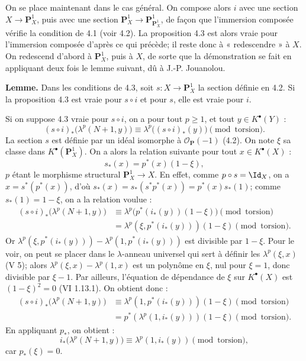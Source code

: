 \documentclass[11pt]{article}
\begin{document}
On se place maintenant dans le cas général. On compose alors \(i\) avec une section \(X\to\mathbf P_X^1\), puis avec une section \(\mathbf P_X^1\to\mathbf P_{\mathbf P_X^1}^1\), de façon que l'immersion composée vérifie la condition de 4.1 (voir 4.2). La proposition 4.3 est alors vraie pour l'immersion composée d'après ce qui précède; il reste donc à « redescendre » à \(X\). On redescend d'abord à \(\mathbf P_X^1\), puis à \(X\), de sorte que la démonstration se fait en appliquant deux fois le lemme suivant, dû à J.-P. Jouanolou.

\textbf{Lemme.} Dans les conditions de 4.3, soit \(s:X\to\mathbf P_X^1\) la section définie en 4.2. Si la proposition 4.3 est vraie pour \(s\circ i\) et pour \(s\), elle est vraie pour \(i\).

Si on suppose 4.3 vraie pour \(s\circ i\), on a pour tout \(p\ge1\), et tout \(y\in K^\bullet(Y)\) :
\begin{equation}\tag{4.3.3}
 (s\circ i)_*\bigl(\lambda^p(N+1,y)\bigr)
 \equiv
 \lambda^p\bigl((s\circ i)_*(y)\bigr)
 \pmod{\text{torsion}}.
\end{equation}
La section \(s\) est définie par un idéal isomorphe à \(\mathcal O_{\mathbf P}(-1)\) (4.2). On note \(\xi\) sa classe dans \(K^\bullet(\mathbf P_X^1)\). On a alors la relation suivante pour tout \(x\in K^\bullet(X)\) :
\[
  s_*(x)=p^*(x)(1-\xi),
\]
\(p\) étant le morphisme structural \(\mathbf P_X^1\to X\). En effet, comme \(p\circ s=\Id_X\), on a \(x=s^*(p^*(x))\), d'où \(s_*(x)=s_*(s^*p^*(x))=p^*(x)s_*(1)\); comme \(s_*(1)=1-\xi\), on a la relation voulue :
\[
\begin{aligned}
(s\circ i)_*\bigl(\lambda^p(N+1,y)\bigr)
&\equiv \lambda^p\bigl(p^*(i_*(y))(1-\xi)\bigr)\pmod{\text{torsion}}\\
&= \lambda^p(\xi,p^*(i_*(y)))(1-\xi)\pmod{\text{torsion}}.
\end{aligned}
\]
Or \(\lambda^p(\xi,p^*(i_*(y)))-\lambda^p(1,p^*(i_*(y)))\) est divisible par \(1-\xi\). Pour le voir, on peut se placer dans le \(\lambda\)-anneau universel qui sert à définir les \(\lambda^p(\xi,x)\) (V 5); alors \(\lambda^p(\xi,x)-\lambda^p(1,x)\) est un polynôme en \(\xi\), nul pour \(\xi=1\), donc divisible par \(\xi-1\). Par ailleurs, l'équation de dépendance de \(\xi\) sur \(K^\bullet(X)\) est \((1-\xi)^2=0\) (VI 1.13.1). On obtient donc :
\[
\begin{aligned}
(s\circ i)_*\bigl(\lambda^p(N+1,y)\bigr)
&\equiv \lambda^p(1,p^*(i_*(y)))(1-\xi) \pmod{\text{torsion}}\\
&=p^*(\lambda^p(1,i_*(y)))(1-\xi) \pmod{\text{torsion}}.
\end{aligned}
\]
En appliquant \(p_*\), on obtient :
\begin{equation}\tag{4.3.4}
  i_*\bigl(\lambda^p(N+1,y)\bigr)
  \equiv \lambda^p(1,i_*(y)) \pmod{\text{torsion}},
\end{equation}
car \(p_*(\xi)=0\).
\end{document}
